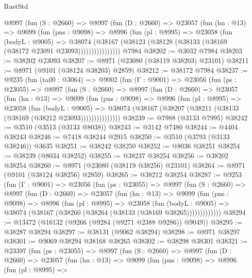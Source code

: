 \begin{lexlean}{RustStd}
\begin{coremodule}
          @8997
            (fun (S : @2660) =>
            @8997
              (fun (D : @2660) =>
              @23057
                (fun (hn : @13) =>
                @9099
                  (fun (pns : @9098) =>
                  @8996
                    (fun (pl : @8995) =>
                    @23058
                      (fun (bodyL : @9005) =>
                      @38074
                        (@38167
                          (@38123 (@38128 (@38133 (@38169 (@38172 @23091 @23093))))))))))))))))
    @7984
@38202 := @3032 @7984
@38203 := @38202 @23093
@38207 := @8971 (@23080 (@38119 @38203) @23101)
@38211 := @8971 (@9101 (@38124 @38203) @2859)
@38212 := @38172 @7984
@38237 := @9235
    (fun (tail0 : @3064) =>
    @9002
      (fun (Γ : @9001) =>
      @23056
        (fun (ps : @23055) =>
        @8997
          (fun (S : @2660) =>
          @8997
            (fun (D : @2660) =>
            @23057
              (fun (hn : @13) =>
              @9099
                (fun (pns : @9098) =>
                @8996
                  (fun (pl : @8995) =>
                  @23058
                    (fun (bodyL : @9005) =>
                    @38074 (@38167 (@38207 (@38211 (@38133 (@38169 (@38212 @23093)))))))))))))))
@38239 := @7988 (@3133 @7995)
@38242 := @3510 (@3513 (@3133 @8038))
@38243 := @3142 @7480
@38244 := @4404 @38243
@38246 := @7418 @38244 @2915
@38250 := @3510 (@3793 (@3133 @38246)) @3635
@38251 := @38242 @38250
@38252 := @8036 @38251
@38254 := @38239 (@8034 @38252)
@38255 := @38237 @38254
@38256 := @38202 @38254
@38260 := @8971 (@23080 (@38119 @38256) @23101)
@38264 := @8971 (@9101 (@38124 @38256) @2859)
@38265 := @38212 @38254
@38287 := @9253
    (fun (Γ : @9001) =>
    @23056
      (fun (ps : @23055) =>
      @8997
        (fun (S : @2660) =>
        @8997
          (fun (D : @2660) =>
          @23057
            (fun (hn : @13) =>
            @9099
              (fun (pns : @9098) =>
              @8996
                (fun (pl : @8995) =>
                @23058
                  (fun (bodyL : @9005) =>
                  @38074 (@38167 (@38260 (@38264 (@38133 (@38169 @38265)))))))))))))
@38294 := @13472 (@16132 (@9266 (@9284 (@9271 @2388 @9286)) @9049))
@38295 := @38287 @38294
@38297 := @38131 (@9062 @38294)
@38298 := @8971 @38297
@38301 := @9069 @38294 @38168 @38265
@38302 := @38298 @38301
@38321 := @23397
    (fun (ps : @23055) =>
    @8997
      (fun (S : @2660) =>
      @8997
        (fun (D : @2660) =>
        @23057
          (fun (hn : @13) =>
          @9099
            (fun (pns : @9098) =>
            @8996
              (fun (pl : @8995) =>

\end{coremodule}
\end{lexlean}
